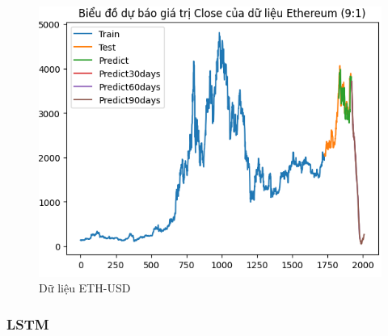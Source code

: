\documentclass[conference]{IEEEtran}
\begin{document}
\begin{figure}[H]
\begin{minipage}{0.15\textwidth}
			\includegraphics[width=1\textwidth]{Figure/ETH91.png}
		\end{minipage}
		\caption{Dữ liệu ETH-USD}
		\label{fig:1}
	\end{figure}
	
	
	\subsubsection{LSTM}
	
\end{document}
